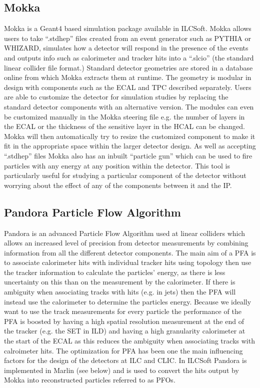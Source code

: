 \subsection{Mokka}
Mokka is a Geant4 based simulation package available in ILCSoft. Mokka allows users to take ``.stdhep'' files created from an event generator such as PYTHIA or WHIZARD, simulates how a detector will respond in the presence of the events and outputs info such as calorimeter and tracker hits into a ``.slcio'' (the standard linear collider file format.) Standard detector geometries are stored in a database online from which Mokka extracts them at runtime. The geometry is modular in design with components such as the ECAL and TPC described separately. Users are able to customize the detector for simulation studies by replacing the standard detector components with an alternative version. The modules can even be customized manually in the Mokka steering file e.g. the number of layers in the ECAL or the thickness of the sensitive layer in the HCAL can be changed. Mokka will then automatically try to resize the customized component to make it fit in the appropriate space within the larger detector design. As well as accepting ``.stdhep'' files Mokka also has an inbuilt ``particle gun'' which can be used to fire particles with any energy at any position within the detector. This tool is particularly useful for studying a particular component of the detector without worrying about the effect of any of the components between it and the \ac{IP}.

\subsection{Pandora Particle Flow Algorithm}
\label{Pandora}
Pandora is an advanced Particle Flow Algorithm used at linear colliders which allows an increased level of precision from detector measurements by combining information from all the different detector components. The main aim of a \ac{PFA} is to associate calorimeter hits with individual tracker hits using topology then use the tracker information to calculate the particles' energy, as there is less uncertainty on this than on the measurement by the calorimeter. If there is ambiguity when associating tracks with hits (e.g. in jets) then the \ac{PFA} will instead use the calorimeter to determine the particles energy. Because we ideally want to use the track measurements for every particle the performance of the \ac{PFA} is boosted by having a high spatial resolution measurement at the end of the tracker (e.g. the \ac{SET} in \ac{ILD}) and having a high granularity calorimeter at the start of the \ac{ECAL} as this reduces the ambiguity when associating tracks with calroimeter hits. The optimization for \ac{PFA} has been one the main influencing factors for the design of the detectors at ILC and CLIC. In ILCSoft Pandora is implemented in Marlin (see below) and is used to convert the hits output by Mokka into reconstructed particles referred to as \ac{PFOs}.

